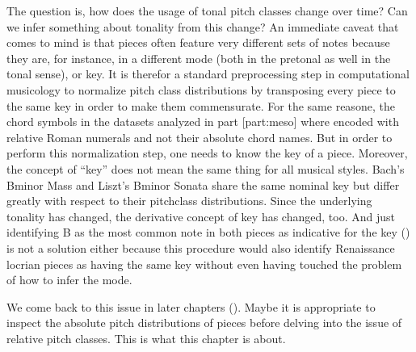 \documentclass[letterpaper,10pt,english]{sphinxmanual}
\begin{document}
\sphinxAtStartPar
The question is, how does the usage of tonal pitch classes change over
time? Can we infer something about tonality from this change? An
immediate caveat that comes to mind is that pieces often feature very
different sets of notes because they are, for instance, in a different
mode (both in the pre\sphinxhyphen{}tonal as well in the tonal sense), or key. It is
therefor a standard preprocessing step in computational musicology to
normalize pitch class distributions by transposing every piece to the
same key in order to make them commensurate. For the same reasone, the
chord symbols in the datasets analyzed in part {[}part:meso{]} where encoded
with relative Roman numerals and not their absolute chord names. But in
order to perform this normalization step, one needs to know the key of a
piece.  Moreover, the concept
of “key” does not mean the same thing for all musical styles. Bach’s
B\sphinxhyphen{}minor Mass and Liszt’s B\sphinxhyphen{}minor Sonata share the same nominal key but
differ greatly with respect to their pitch\sphinxhyphen{}class distributions. Since
the underlying tonality has changed, the derivative concept of key has
changed, too. And just identifying B as the most common note in both
pieces as indicative for the key () is not
a solution either because this procedure would also identify Renaissance
locrian pieces as having the same key without even having touched the
problem of how to infer the mode.

\sphinxAtStartPar
We come back to this issue in later chapters (). Maybe it is
appropriate to inspect the absolute pitch distributions of pieces before
delving into the issue of relative pitch classes. This is what this
chapter is about.
\end{document}
